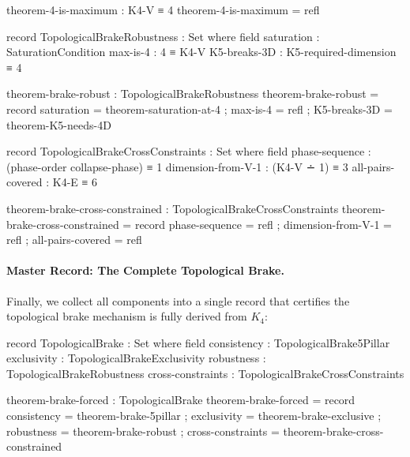 \documentclass[11pt,a4paper]{book}
\begin{document}
\begin{code}
theorem-4-is-maximum : K4-V ≡ 4
theorem-4-is-maximum = refl

record TopologicalBrakeRobustness : Set where
  field
    saturation    : SaturationCondition
    max-is-4      : 4 ≡ K4-V
    K5-breaks-3D  : K5-required-dimension ≡ 4

theorem-brake-robust : TopologicalBrakeRobustness
theorem-brake-robust = record
  { saturation = theorem-saturation-at-4
  ; max-is-4 = refl
  ; K5-breaks-3D = theorem-K5-needs-4D
  }

record TopologicalBrakeCrossConstraints : Set where
  field
    phase-sequence     : (phase-order collapse-phase) ≡ 1
    dimension-from-V-1 : (K4-V ∸ 1) ≡ 3
    all-pairs-covered  : K4-E ≡ 6

theorem-brake-cross-constrained : TopologicalBrakeCrossConstraints
theorem-brake-cross-constrained = record
  { phase-sequence = refl
  ; dimension-from-V-1 = refl
  ; all-pairs-covered = refl
  }
\end{code}

\paragraph{Master Record: The Complete Topological Brake.}

Finally, we collect all components into a single record that certifies the topological 
brake mechanism is fully derived from $K_4$:

\begin{code}
record TopologicalBrake : Set where
  field
    consistency      : TopologicalBrake5Pillar
    exclusivity      : TopologicalBrakeExclusivity
    robustness       : TopologicalBrakeRobustness
    cross-constraints : TopologicalBrakeCrossConstraints

theorem-brake-forced : TopologicalBrake
theorem-brake-forced = record
  { consistency = theorem-brake-5pillar
  ; exclusivity = theorem-brake-exclusive
  ; robustness = theorem-brake-robust
  ; cross-constraints = theorem-brake-cross-constrained
  }
\end{code}
\end{document}

